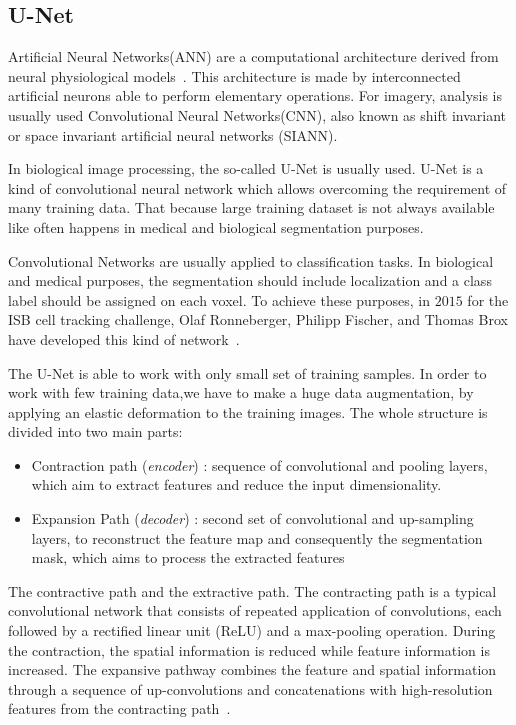 \documentclass{standalone}
\begin{document}
	\subsection{U-Net}
		
	Artificial Neural Networks(ANN) are a computational architecture derived from neural physiological models~\cite{INP:Withey}. This architecture is made by interconnected artificial neurons able to perform elementary operations.  For imagery, analysis is usually used Convolutional Neural Networks(CNN), also known as shift invariant or space invariant artificial neural networks (SIANN).

	In biological image processing, the so-called U-Net is usually used. U-Net is a kind of convolutional neural network which allows overcoming the requirement of many training data. That because large training dataset is not always available like often happens in medical and biological segmentation purposes.

	Convolutional Networks are usually applied to classification tasks. In biological and medical purposes, the segmentation should include localization and a class label should be assigned on each voxel. To achieve these purposes, in $2015$ for the ISB cell tracking challenge, Olaf Ronneberger, Philipp Fischer, and Thomas Brox have developed this kind of network~\cite{ART:Johannes}.
		
	The U-Net is able to work with only small set of training samples. 	In order to work with few training data,we have to make a huge data augmentation, by applying an elastic deformation to the training images. The whole structure is divided into two main parts:
	\begin{itemize}
		\item Contraction path (\textit{encoder}) : sequence of convolutional and pooling layers, which aim
			to extract features and reduce the input dimensionality. 
			
		\item Expansion Path (\textit{decoder}) : second set of convolutional and up-sampling layers, to reconstruct the
			feature map and consequently the segmentation mask, which aims to process the extracted features
	\end{itemize}
	
	The contractive path and the extractive path. The contracting path is a typical convolutional network that consists of repeated application of convolutions, each followed by a rectified linear unit (ReLU) and a max-pooling operation. During the contraction, the spatial information is reduced while feature information is increased. The expansive pathway combines the feature and spatial information through a sequence of up-convolutions and concatenations with high-resolution features from the contracting path~\cite{ART:Johannes}.
\end{document}
